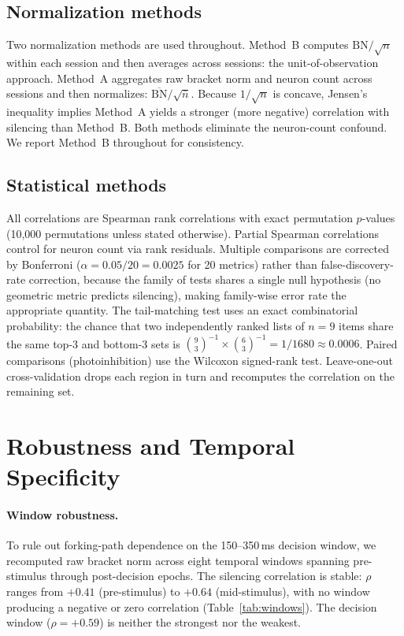 \documentclass[9pt,lineno]{elife}
\begin{document}
\subsection{Normalization methods}
\label{sec:normalization}

Two normalization methods are used throughout. Method~B computes $\text{BN}/\!\sqrt{n}$ within each session and then averages across sessions: the unit-of-observation approach. Method~A aggregates raw bracket norm and neuron count across sessions and then normalizes: $\overline{\text{BN}}/\!\sqrt{\bar{n}}$. Because $1/\!\sqrt{n}$ is concave, Jensen's inequality implies Method~A yields a stronger (more negative) correlation with silencing than Method~B. Both methods eliminate the neuron-count confound. We report Method~B throughout for consistency.

\subsection{Statistical methods}
\label{sec:stats}

All correlations are Spearman rank correlations with exact permutation $p$-values (10{,}000 permutations unless stated otherwise). Partial Spearman correlations control for neuron count via rank residuals. Multiple comparisons are corrected by Bonferroni ($\alpha = 0.05 / 20 = 0.0025$ for 20 metrics) rather than false-discovery-rate correction, because the family of tests shares a single null hypothesis (no geometric metric predicts silencing), making family-wise error rate the appropriate quantity. The tail-matching test uses an exact combinatorial probability: the chance that two independently ranked lists of $n = 9$ items share the same top-3 and bottom-3 sets is $\binom{9}{3}^{-1} \times \binom{6}{3}^{-1} = 1/1680 \approx 0.0006$. Paired comparisons (photoinhibition) use the Wilcoxon signed-rank test. Leave-one-out cross-validation drops each region in turn and recomputes the correlation on the remaining set.




\clearpage
\appendix

\section{Robustness and Temporal Specificity}
\label{app:robustness}

\paragraph{Window robustness.} To rule out forking-path dependence on the 150--350\,ms decision window, we recomputed raw bracket norm across eight temporal windows spanning pre-stimulus through post-decision epochs. The silencing correlation is stable: $\rho$ ranges from $+0.41$ (pre-stimulus) to $+0.64$ (mid-stimulus), with no window producing a negative or zero correlation (Table~\ref{tab:windows}). The decision window ($\rho = +0.59$) is neither the strongest nor the weakest.
\end{document}
